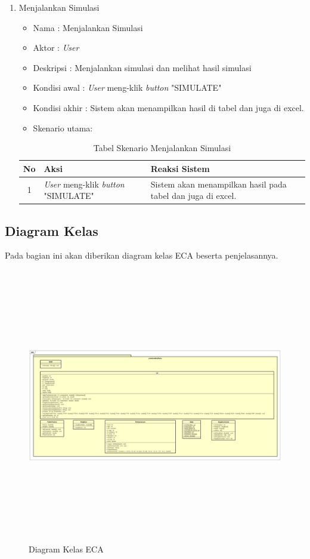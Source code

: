 \begin{enumerate}
	\item Menjalankan Simulasi
		\begin{itemize}
			\item Nama : Menjalankan Simulasi
			\item Aktor : \textit{User}
			\item Deskripsi : Menjalankan simulasi dan melihat hasil simulasi
			\item Kondisi awal : \textit{User} meng-klik \textit{button} "SIMULATE"
			\item Kondisi akhir : Sistem akan menampilkan hasil di tabel dan juga di excel.
			\item Skenario utama:
		\end{itemize}
		
\begin{table}[H]
\centering
\caption{Tabel Skenario Menjalankan Simulasi}
\begin{tabular}{|c|p{7cm}|p{7cm}|}
\hline
No & Aksi & Reaksi Sistem\\
\hline
1 & \textit{User} meng-klik \textit{button} "SIMULATE" & Sistem akan menampilkan hasil pada tabel dan juga di excel. \\
\hline
\end{tabular}
\label{tabelSkenario3}
\end{table}
		
\end{enumerate}


\subsection{Diagram Kelas}


Pada bagian ini akan diberikan diagram kelas ECA beserta penjelasannya.

	\begin{figure} [H]
		\centering  
		\includegraphics[width=18cm, height=12cm]{diagramKelas0} 
		\caption[Diagram Kelas ECA]{Diagram Kelas ECA} 
		\label{fig:CD1} 
	\end{figure}
	

